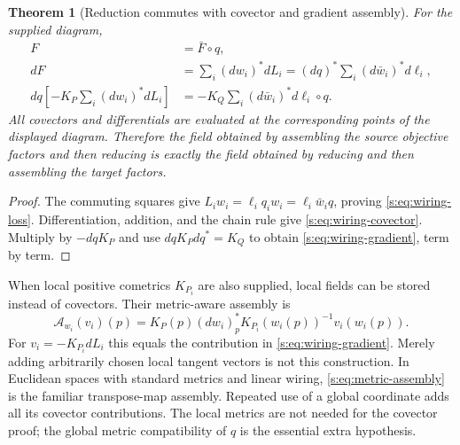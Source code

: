 \documentclass[11pt]{article}
\newtheorem{theorem}{Theorem}[section]
\theoremstyle{definition}
\theoremstyle{remark}\newtheorem{remark}[theorem]{Remark}
\begin{document}
\begin{theorem}[Reduction commutes with covector and gradient assembly]
\label{s:thm:wiring}
For the supplied diagram,
\begin{align}
 F&=\bar F\circ q,\label{s:eq:wiring-loss}\\
 dF&=\sum_i(dw_i)^*dL_i
      =(dq)^*\sum_i(d\bar w_i)^*d\ell_i,\label{s:eq:wiring-covector}\\
 dq\left[-K_P\sum_i(dw_i)^*dL_i\right]
   &=-K_Q\sum_i(d\bar w_i)^*d\ell_i\circ q.
 \label{s:eq:wiring-gradient}
\end{align}
All covectors and differentials are evaluated at the corresponding points
of the displayed diagram. Therefore the field obtained by assembling the
source objective factors and then reducing is exactly the field obtained
by reducing and then assembling the target factors.
\end{theorem}
\begin{proof}
The commuting squares give
$L_iw_i=\ell_iq_iw_i=\ell_i\bar w_iq$, proving
\eqref{s:eq:wiring-loss}. Differentiation, addition, and the chain rule give
\eqref{s:eq:wiring-covector}. Multiply by $-dqK_P$ and use
$dqK_Pdq^*=K_Q$ to obtain \eqref{s:eq:wiring-gradient}, term by term.
\end{proof}

When local positive cometrics $K_{P_i}$ are also supplied, local fields can
be stored instead of covectors. Their metric-aware assembly is
\begin{equation}\label{s:eq:metric-assembly}
 \mathcal A_{w_i}(v_i)(p)
 =K_P(p)(dw_i)_p^*K_{P_i}(w_i(p))^{-1}v_i(w_i(p)).
\end{equation}
For $v_i=-K_{P_i}dL_i$ this equals the contribution in
\eqref{s:eq:wiring-gradient}. Merely adding arbitrarily chosen local tangent
vectors is not this construction. In Euclidean spaces with standard metrics
and linear wiring, \eqref{s:eq:metric-assembly} is the familiar transpose-map
assembly. Repeated use of a global coordinate adds all its covector
contributions. The local metrics are not needed for the covector proof;
the global metric compatibility of $q$ is the essential extra hypothesis.
\end{document}
